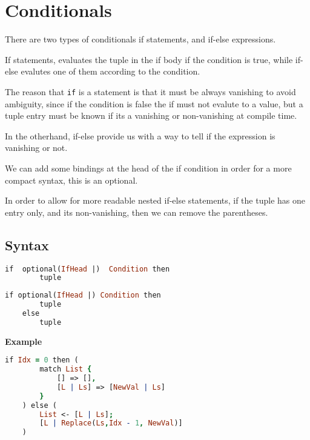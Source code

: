 \section{Conditionals}

There are two types of conditionals if statements, and if-else
expressions.

If statements, evaluates the tuple in the if body if the condition is
true, while if-else evalutes one of them according to the condition.

The reason that \texttt{if} is a statement is that it must be always
vanishing to avoid ambiguity, since if the condition is false the if
must not evalute to a value, but a tuple entry must be known if its a
vanishing or non-vanishing at compile time.

In the otherhand, if-else provide us with a way to tell if the
expression is vanishing or not.

We can add some bindings at the head of the if condition in order for
a more compact syntax, this is an optional.

In order to allow for more readable nested if-else statements, if the
tuple has one entry only, and its non-vanishing, then we can remove
the parentheses.

\subsection{Syntax}
\begin{lstlisting}[language =Prolog]
    if  optional(IfHead |)  Condition then 
        tuple
\end{lstlisting}

\begin{lstlisting}[language =Prolog]
    if optional(IfHead |) Condition then 
        tuple
    else 
        tuple
\end{lstlisting}

\textbf{Example}

\begin{enumerate}
	\begin{lstlisting}[language =Prolog]
    if Idx = 0 then (
        match List {
            [] => [],
            [L | Ls] => [NewVal | Ls]
        }
    ) else (
        List <- [L | Ls]; 
        [L | Replace(Ls,Idx - 1, NewVal)]
    )
    \end{lstlisting}
\end{enumerate}

